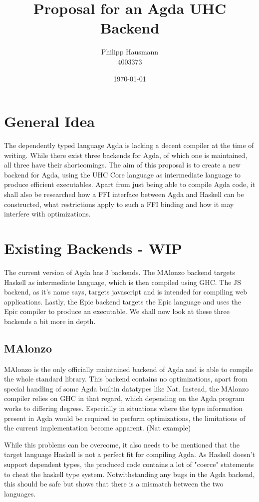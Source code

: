 \documentclass[12pt, a4paper, twoside]{report}
\title{Proposal for an Agda UHC Backend}
\author{Philipp Hausmann \\
    4003373 \\
    }
\date{\today}
\begin{document}
\maketitle

\tableofcontents

\chapter{General Idea}
The dependently typed language Agda is lacking a decent compiler at the time of writing. While there
exist three backends for Agda, of which one is maintained, all three have their shortcomings.
The aim of this proposal is to create a new backend for Agda, using the UHC Core language
as intermediate language to produce efficient executables. Apart from just being able to compile
Agda code, it shall also be researched how a FFI interface between Agda and Haskell can be constructed,
what restrictions apply to such a FFI binding and how it may interfere with optimizations.

\chapter{Existing Backends - WIP}
The current version of Agda has 3 backends. The MAlonzo backend targets Haskell as intermediate
language, which is then compiled using GHC. The JS backend, as it's name says, targets javascript
and is intended for compiling web applications. Lastly, the Epic backend targets the Epic language
and uses the Epic compiler to produce an executable.
We shall now look at these three backends a bit more in depth.
\section{MAlonzo}
MAlonzo is the only officially maintained backend of Agda and is able to compile the whole standard
library. This backend contains no optimizations, apart from special handling of some Agda builtin
datatypes like Nat. Instead, the MAlonzo compiler relies on GHC in that regard, which depending
on the Agda program works to differing degress. Especially in situations where the type information
present in Agda would be required to perform optimizations, the limitations of the current implementation
become apparent. (Nat example)

While this problems can be overcome, it also needs to be mentioned that the target language Haskell
is not a perfect fit for compiling Agda. As Haskell doesn't support dependent types, the produced
code contains a lot of "coerce" statements to cheat the haskell type system. Notwithstanding any
bugs in the Agda backend, this should be safe but shows that there is a mismatch between the
two languages.
\end{document}
